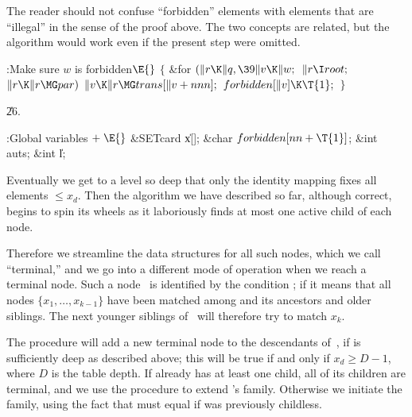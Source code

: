 The reader should not confuse ``forbidden'' elements with elements that are
``illegal'' in the sense of the proof above. The two concepts are related,
but the algorithm would work even if the present step were omitted.

\Y\B\4:Make sure $w$ is forbidden\X${}\E{}$\6
${}\{{}$\1\6
\&{for} ${}(\|r\K\|q,\39\|v\K\|w;{}$ ${}\|r\I\\{root};{}$ ${}\|r\K\|r\MG%
\\{par}){}$\1\5
${}\|v\K\|r\MG\\{trans}[\|v+\\{nnn}];{}$\2\6
${}\\{forbidden}[\|v]\K\T{1};{}$\6
\4${}\}{}$\2\par
\U26.\fi

\B{}:Global variables\X${}\mathrel+\E{}$\6
\&{SETcard} \|x[];\6
\&{char} ${}\\{forbidden}[\\{nn}+\T{1}]{}$;\6
\&{int} \\{auts};\6
\&{int} \|l;\par
\fi

Eventually we get to a level so deep that only the identity mapping fixes
all elements $\le x_d$. Then the algorithm we have described so far,
although correct, begins to spin its wheels as it laboriously finds at
most one active child of each node.

Therefore we streamline the data structures for all such nodes, which we
call ``terminal,'' and we go into a different mode of operation when we
reach a terminal node. Such a node~ is identified by the condition
;
if  it means that all nodes $\{x_1,\ldots,x_{k-1}\}$
have
been matched among  and its ancestors and older siblings. The next
younger siblings of~ will therefore try to match $x_k$.

The  procedure will add a new terminal node to the descendants
of~, if  is sufficiently deep as described above; this will be
true
if and only if $x_d\ge D-1$, where $D$ is the  table depth.
If  already has at least one child, all of its children are terminal,
and we use the  procedure to extend 's
family.
Otherwise we initiate the family, using the fact that  must equal 
if  was previously childless.

